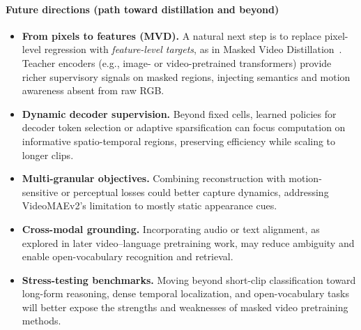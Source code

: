 \begin{enrichment}
\begin{enrichment}
            \paragraph{Future directions (path toward distillation and beyond)}
            \begin{itemize}
                \item \textbf{From pixels to features (MVD).} A natural next step is to replace pixel-level regression with \emph{feature-level targets}, as in Masked Video Distillation~\cite{wang2023_mvd}. Teacher encoders (e.g., image- or video-pretrained transformers) provide richer supervisory signals on masked regions, injecting semantics and motion awareness absent from raw RGB.
                \item \textbf{Dynamic decoder supervision.} Beyond fixed cells, learned policies for decoder token selection or adaptive sparsification can focus computation on informative spatio-temporal regions, preserving efficiency while scaling to longer clips.
                \item \textbf{Multi-granular objectives.} Combining reconstruction with motion-sensitive or perceptual losses could better capture dynamics, addressing VideoMAEv2’s limitation to mostly static appearance cues.
                \item \textbf{Cross-modal grounding.} Incorporating audio or text alignment, as explored in later video–language pretraining work, may reduce ambiguity and enable open-vocabulary recognition and retrieval.
                \item \textbf{Stress-testing benchmarks.} Moving beyond short-clip classification toward long-form reasoning, dense temporal localization, and open-vocabulary tasks will better expose the strengths and weaknesses of masked video pretraining methods.
            \end{itemize}
        
    \end{enrichment}
    
    \newpage
    
    \begin{enrichment}
        \label{enr:subsec_chapter24_mvd}
            

\end{enrichment}
\end{enrichment}
